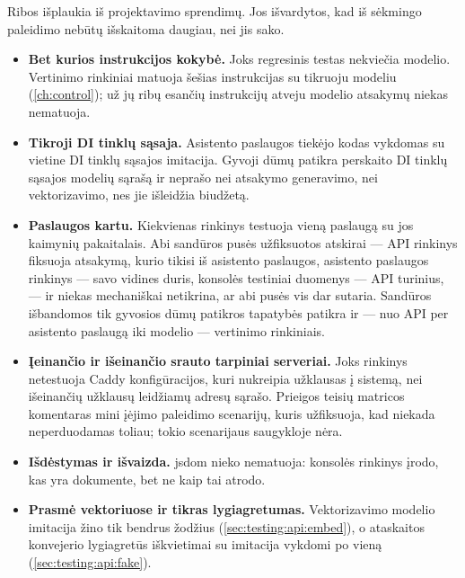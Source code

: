 Ribos išplaukia iš projektavimo sprendimų. Jos išvardytos, kad iš sėkmingo paleidimo nebūtų
išskaitoma daugiau, nei jis sako.

\begin{itemize}
  \item \textbf{Bet kurios instrukcijos kokybė.} Joks regresinis testas nekviečia modelio.
        Vertinimo rinkiniai matuoja šešias instrukcijas su tikruoju modeliu (\cref{ch:control});
        už jų ribų esančių instrukcijų atveju modelio atsakymų niekas nematuoja.
  \item \textbf{Tikroji DI tinklų sąsaja.} Asistento paslaugos tiekėjo kodas vykdomas su vietine
        DI tinklų sąsajos imitacija. Gyvoji dūmų patikra perskaito DI tinklų sąsajos modelių
        sąrašą ir neprašo nei atsakymo generavimo, nei vektorizavimo, nes jie išleidžia
        biudžetą.
  \item \textbf{Paslaugos kartu.} Kiekvienas rinkinys testuoja vieną paslaugą su jos kaimynių
        pakaitalais. Abi sandūros pusės užfiksuotos atskirai --- API rinkinys fiksuoja
        atsakymą, kurio tikisi iš asistento paslaugos, asistento paslaugos rinkinys --- savo
        vidines duris, konsolės testiniai duomenys --- API turinius, --- ir niekas mechaniškai
        netikrina, ar abi pusės vis dar sutaria. Sandūros išbandomos tik
        gyvosios dūmų patikros tapatybės patikra ir --- nuo API per asistento paslaugą iki
        modelio --- vertinimo rinkiniais.
  \item \textbf{Įeinančio ir išeinančio srauto tarpiniai serveriai.} Joks rinkinys netestuoja
        Caddy konfigūracijos, kuri nukreipia užklausas į sistemą, nei išeinančių užklausų
        leidžiamų adresų sąrašo. Prieigos teisių matricos komentaras mini įėjimo paleidimo
        scenarijų, kuris užfiksuoja, kad  niekada neperduodamas toliau;
        tokio scenarijaus saugykloje nėra.
  \item \textbf{Išdėstymas ir išvaizda.} jsdom nieko nematuoja: konsolės rinkinys įrodo, kas
        yra dokumente, bet ne kaip tai atrodo.
  \item \textbf{Prasmė vektoriuose ir tikras lygiagretumas.} Vektorizavimo modelio imitacija
        žino tik bendrus žodžius (\cref{sec:testing:api:embed}), o ataskaitos konvejerio
        lygiagretūs iškvietimai su imitacija vykdomi po vieną (\cref{sec:testing:api:fake}).
\end{itemize}
